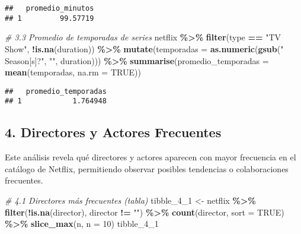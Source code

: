 \documentclass[
]{article}
\newenvironment{Shaded}{\begin{snugshade}}{\end{snugshade}}
\newcommand{\AttributeTok}[1]{\textcolor[rgb]{0.13,0.29,0.53}{#1}}
\newcommand{\CommentTok}[1]{\textcolor[rgb]{0.56,0.35,0.01}{\textit{#1}}}
\newcommand{\ConstantTok}[1]{\textcolor[rgb]{0.56,0.35,0.01}{#1}}
\newcommand{\DecValTok}[1]{\textcolor[rgb]{0.00,0.00,0.81}{#1}}
\newcommand{\FunctionTok}[1]{\textcolor[rgb]{0.13,0.29,0.53}{\textbf{#1}}}
\newcommand{\NormalTok}[1]{#1}
\newcommand{\OtherTok}[1]{\textcolor[rgb]{0.56,0.35,0.01}{#1}}
\newcommand{\SpecialCharTok}[1]{\textcolor[rgb]{0.81,0.36,0.00}{\textbf{#1}}}
\newcommand{\StringTok}[1]{\textcolor[rgb]{0.31,0.60,0.02}{#1}}
\begin{document}
\begin{verbatim}
##   promedio_minutos
## 1         99.57719
\end{verbatim}

\begin{Shaded}
\begin{Highlighting}[]
\CommentTok{\# 3.3 Promedio de temporadas de series}
\NormalTok{netflix }\SpecialCharTok{\%\textgreater{}\%}
  \FunctionTok{filter}\NormalTok{(type }\SpecialCharTok{==} \StringTok{"TV Show"}\NormalTok{, }\SpecialCharTok{!}\FunctionTok{is.na}\NormalTok{(duration)) }\SpecialCharTok{\%\textgreater{}\%}
  \FunctionTok{mutate}\NormalTok{(}\AttributeTok{temporadas =} \FunctionTok{as.numeric}\NormalTok{(}\FunctionTok{gsub}\NormalTok{(}\StringTok{" Season[s]?"}\NormalTok{, }\StringTok{""}\NormalTok{, duration))) }\SpecialCharTok{\%\textgreater{}\%}
  \FunctionTok{summarise}\NormalTok{(}\AttributeTok{promedio\_temporadas =} \FunctionTok{mean}\NormalTok{(temporadas, }\AttributeTok{na.rm =} \ConstantTok{TRUE}\NormalTok{))}
\end{Highlighting}
\end{Shaded}

\begin{verbatim}
##   promedio_temporadas
## 1            1.764948
\end{verbatim}

\subsection{4. Directores y Actores
Frecuentes}\label{directores-y-actores-frecuentes}

Este análisis revela qué directores y actores aparecen con mayor
frecuencia en el catálogo de Netflix, permitiendo observar posibles
tendencias o colaboraciones frecuentes.

\begin{Shaded}
\begin{Highlighting}[]
\CommentTok{\# 4.1 Directores más frecuentes (tabla)}
\NormalTok{tibble\_4\_1 }\OtherTok{\textless{}{-}}\NormalTok{ netflix }\SpecialCharTok{\%\textgreater{}\%}
  \FunctionTok{filter}\NormalTok{(}\SpecialCharTok{!}\FunctionTok{is.na}\NormalTok{(director), director }\SpecialCharTok{!=} \StringTok{""}\NormalTok{) }\SpecialCharTok{\%\textgreater{}\%}
  \FunctionTok{count}\NormalTok{(director, }\AttributeTok{sort =} \ConstantTok{TRUE}\NormalTok{) }\SpecialCharTok{\%\textgreater{}\%}
  \FunctionTok{slice\_max}\NormalTok{(n, }\AttributeTok{n =} \DecValTok{10}\NormalTok{)}
\NormalTok{tibble\_4\_1}
\end{Highlighting}
\end{Shaded}
\end{document}
